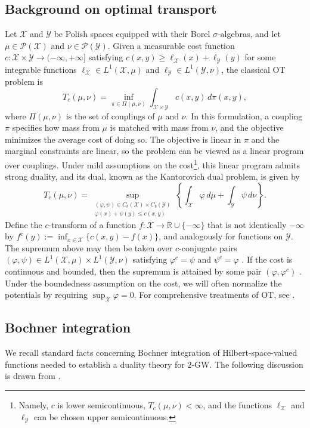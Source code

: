 \documentclass[11pt]{amsart}
\theoremstyle{definition}
\theoremstyle{remark}
\newcommand{\1}{\mathbf{1}}
\numberwithin{equation}{section}
\begin{document}
\subsection{Background on optimal transport} 
Let $\mathcal X$ and $\mathcal Y$ be Polish spaces equipped with their Borel
$\sigma$-algebras, and let $\mu \in \mathcal P(\mathcal X)$ and
$\nu \in \mathcal P(\mathcal Y)$. Given a measurable cost function
$c:\mathcal X \times \mathcal Y \to (-\infty,+\infty]$ satisfying
$c(x,y)\geq \ell_{\mathcal X}(x)+\ell_{\mathcal Y}(y)$ for some
integrable functions $\ell_{\mathcal X}\in L^1(\mathcal X,\mu)$ and
$\ell_{\mathcal Y}\in L^1(\mathcal Y,\nu)$, the classical OT problem is
\[
T_c(\mu,\nu)
=
\inf_{\pi\in\Pi(\mu,\nu)}
\int_{\mathcal X \times \mathcal Y} c(x,y)\,d\pi(x,y),
\]
where $\Pi(\mu,\nu)$ is the set of couplings of $\mu$ and $\nu$. In this
formulation, a coupling $\pi$ specifies how mass from $\mu$ is matched with
mass from $\nu$, and the objective minimizes the average cost of doing so.
The objective is linear in $\pi$ and the marginal constraints are linear, so
the problem can be viewed as a linear program over couplings. Under mild assumptions on the cost\footnote{Namely, $c$ is lower
semicontinuous, $T_c(\mu,\nu)<\infty$, and the functions
$\ell_{\mathcal X}$ and $\ell_{\mathcal Y}$
can be chosen upper semicontinuous.}, this linear program admits strong duality, and its
dual, known as the Kantorovich dual problem, is given by
\[
T_c(\mu,\nu)
=
\sup_{\substack{
(\varphi,\psi)\in C_b(\mathcal X)\times C_b(\mathcal Y)\\
\varphi(x)+\psi(y)\leq c(x,y)
}}
\left\{
\int_{\mathcal X}\varphi\,d\mu
+
\int_{\mathcal Y}\psi\,d\nu
\right\}.
\]
Define the $c$-transform of a function
$f:\mathcal X\to\mathbb R\cup\{-\infty\}$ that is not identically
$-\infty$ by
$f^c(y):=\inf_{x\in\mathcal X}\{c(x,y)-f(x)\}$, and analogously for
functions on $\mathcal Y$. The supremum above may then be taken over $c$-conjugate pairs
$(\varphi,\psi)\in L^1(\mathcal X,\mu)\times L^1(\mathcal Y,\nu)$ satisfying
$\varphi^c=\psi$ and $\psi^c=\varphi$
\cite[Thm.~5.10(i)]{villani2009optimal}. If the cost is continuous and bounded,
then the supremum is attained by some pair $(\varphi,\varphi^c)$
\cite[Thm.~5.10(iii)]{villani2009optimal}. Under the boundedness assumption on the cost, we
will often normalize the potentials by requiring
$\sup_{\mathcal X}\varphi=0$. For comprehensive treatments of OT, see
\cite{peyre2019computational,santambrogio2015optimal,villani2009optimal}.


\subsection{Bochner integration}
We recall standard facts concerning Bochner integration of Hilbert-space-valued functions needed to establish a duality theory for $2$-GW. The following discussion is drawn from \cite[Section~1.2]{hytonen2016analysis}.
\end{document}
